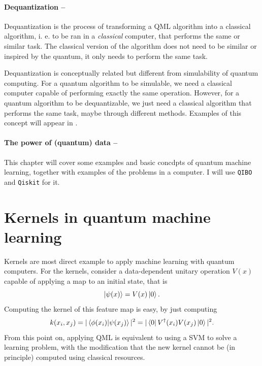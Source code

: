 \documentclass[]{report}
\begin{document}
\paragraph{Dequantization --} Dequantization is the process of transforming a QML algorithm into a classical algorithm, i. e. to be ran in a \textit{classical} computer, that performs the same or similar task. The classical version of the algorithm does not need to be similar or inspired by the quantum, it only needs to perform the same task. 

Dequantization is conceptually related but different from simulability of quantum computing. For a quantum algorithm to be simulable, we need a classical computer capable of performing exactly the same operation. However, for a quantum algorithm to be dequantizable, we just need a classical algorithm that performs the same task, maybe through different methods. Examples of this concept will appear in .

\paragraph{The power of (quantum) data --}

This chapter will cover some examples and basic concdpts of quantum machine learning, together with examples of the problems in a computer. I will use {\tt QIBO} and {\tt Qiskit} for it.  

\section{Kernels in quantum machine learning}

Kernels are most direct example to apply machine learning with quantum computers. For the kernels, consider a data-dependent unitary operation $V(x)$ capable of applying a map to an initial state, that is
\begin{equation}
\ket{\psi(x)} = V(x) \ket 0.
\end{equation}
Computing the kernel of this feature map is easy, by just computing
\begin{equation}
k(x_i, x_j) = \vert \braket{\phi(x_i)}{\psi(x_j)} \vert^2 = \vert \bra 0 V^\dagger (x_i) V(x_j) \ket 0 \vert^2.
\end{equation}
From this point on, applying QML is equivalent to using a SVM to solve a learning problem, with the modification that the new kernel cannot be (in principle) computed using classical resources. 
\end{document}
